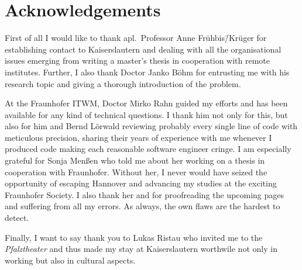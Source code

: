 \chapter*{Acknowledgements}

First of all I would like to thank apl.~Professor Anne Frühbis\=/Krüger for establishing contact to Kaiserslautern and dealing with all the organisational issues emerging from writing a master's thesis in cooperation with remote institutes. Further, I also thank Doctor Janko Böhm for entrusting me with his research topic and giving a thorough introduction of the problem.

At the \acl{Fraunhofer ITWM}, Doctor Mirko Rahn guided my efforts and has been available for any kind of technical questions. I thank him not only for this, but also for him and Bernd Lörwald reviewing probably every single line of code with meticulous precision, sharing their years of experience with me whenever I produced code making each reasonable software engineer cringe. I am especially grateful for Sonja Menßen who told me about her working on a thesis in cooperation with Fraunhofer. Without her, I never would have seized the opportunity of escaping Hannover and advancing my studies at the exciting Fraunhofer Society. I also thank her and  for proofreading the upcoming pages and suffering from all my errors. As always, the own flaws are the hardest to detect.

Finally, I want to say thank you to Lukas Ristau who invited me to the \emph{Pfalztheater} and thus made my stay at Kaiserslautern worthwile not only in working but also in cultural aspects.